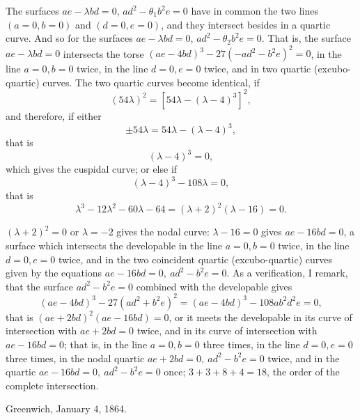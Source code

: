 \documentclass[11pt]{article}
\begin{document}
The surfaces $ae - \lambda bd = 0$, $ad^2 - \theta_1 b^2 e = 0$ have in common the two lines $(a=0, b=0)$ and $(d=0, e=0)$, and they intersect besides in a quartic curve. And so for the surfaces $ae - \lambda bd = 0$, $ad^2 - \theta_2 b^2 e = 0$. That is, the surface $ae - \lambda bd = 0$ intersects the torse $(ae - 4bd)^3 - 27(-ad^2 - b^2 e)^2 = 0$, in the line $a = 0, b = 0$ twice, in the line $d = 0, e = 0$ twice, and in two quartic (excubo-quartic) curves. The two quartic curves become identical, if
\[ (54\lambda)^2 = [54\lambda - (\lambda - 4)^3]^2, \]
and therefore, if either
\[ \pm 54\lambda = 54\lambda - (\lambda - 4)^3, \]
that is
\[ (\lambda - 4)^3 = 0, \]
which gives the cuspidal curve; or else if
\[ (\lambda - 4)^3 - 108\lambda = 0, \]
that is
\[ \lambda^3 - 12\lambda^2 - 60\lambda - 64 = (\lambda + 2)^2(\lambda - 16) = 0. \]

$(\lambda + 2)^2 = 0$ or $\lambda = -2$ gives the nodal curve: $\lambda - 16 = 0$ gives $ae - 16bd = 0$, a surface which intersects the developable in the line $a = 0, b = 0$ twice, in the line $d = 0, e = 0$ twice, and in the two coincident quartic (excubo-quartic) curves given by the equations $ae - 16bd = 0,\ ad^2 - b^2 e = 0$. As a verification, I remark, that the surface $ad^2 - b^2 e = 0$ combined with the developable gives
\[ (ae - 4bd)^3 - 27(ad^2 + b^2 e)^2 = (ae - 4bd)^3 - 108 a b^2 d^2 e = 0, \]
that is $(ae + 2bd)^2 (ae - 16bd) = 0$, or it meets the developable in its curve of intersection with $ae + 2bd = 0$ twice, and in its curve of intersection with $ae - 16bd = 0$; that is, in the line $a = 0, b = 0$ three times, in the line $d = 0, e = 0$ three times, in the nodal quartic $ae + 2bd = 0,\ ad^2 - b^2 e = 0$ twice, and in the quartic $ae - 16bd = 0,\ ad^2 - b^2 e = 0$ once; $3 + 3 + 8 + 4 = 18$, the order of the complete intersection.

\medskip\noindent Greenwich, January 4, 1864.

\medskip
\end{document}
